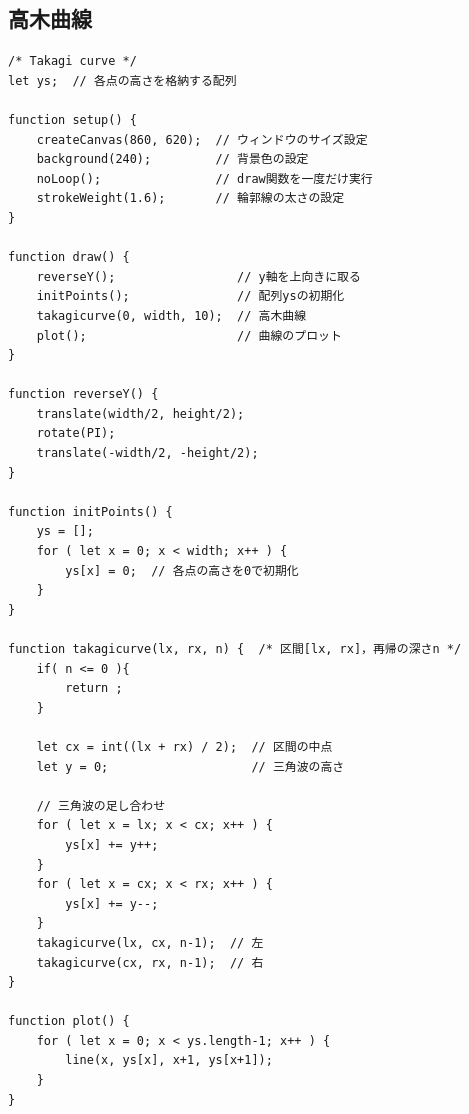 \documentclass[dvipdfmx]{jsarticle}
\theoremstyle{definition}
\begin{document}
\subsection{高木曲線}  \label{subsec_code_takagi_curve}
\begin{lstlisting}[caption=高木曲線, label=code_takagi_curve_all]
/* Takagi curve */
let ys;  // 各点の高さを格納する配列

function setup() {
    createCanvas(860, 620);  // ウィンドウのサイズ設定
    background(240);         // 背景色の設定
    noLoop();                // draw関数を一度だけ実行
    strokeWeight(1.6);       // 輪郭線の太さの設定
}

function draw() {
    reverseY();                 // y軸を上向きに取る
    initPoints();               // 配列ysの初期化
    takagicurve(0, width, 10);  // 高木曲線
    plot();                     // 曲線のプロット
}

function reverseY() {
    translate(width/2, height/2);
    rotate(PI);
    translate(-width/2, -height/2);
}

function initPoints() {
    ys = [];
    for ( let x = 0; x < width; x++ ) {
        ys[x] = 0;  // 各点の高さを0で初期化
    }
}

function takagicurve(lx, rx, n) {  /* 区間[lx, rx]，再帰の深さn */
    if( n <= 0 ){
        return ;
    }

    let cx = int((lx + rx) / 2);  // 区間の中点
    let y = 0;                    // 三角波の高さ

    // 三角波の足し合わせ
    for ( let x = lx; x < cx; x++ ) {
        ys[x] += y++;
    }
    for ( let x = cx; x < rx; x++ ) {
        ys[x] += y--;
    }
    takagicurve(lx, cx, n-1);  // 左
    takagicurve(cx, rx, n-1);  // 右
}

function plot() {
    for ( let x = 0; x < ys.length-1; x++ ) {
        line(x, ys[x], x+1, ys[x+1]);
    }
}
\end{lstlisting}
\clearpage

\end{document}
